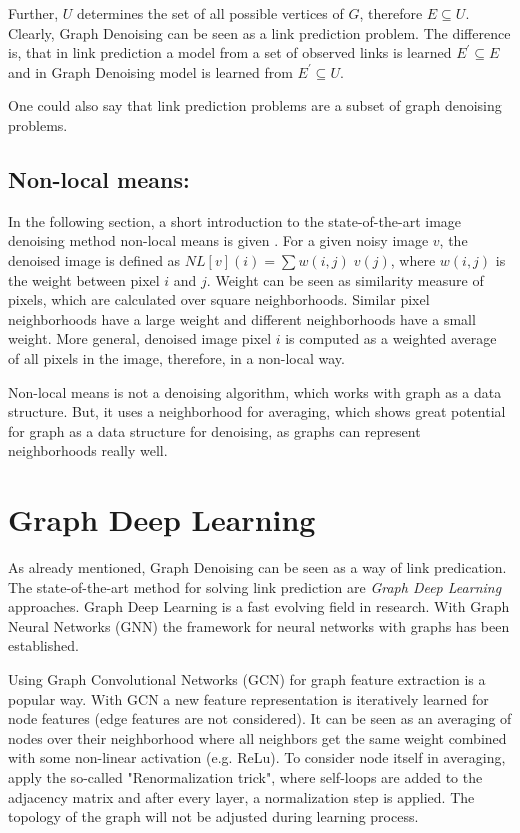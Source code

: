 Further, $U$ determines the set of all possible vertices of $G$, therefore $E \subseteq U$.
Clearly, Graph Denoising can be seen as a link prediction problem.
The difference is, that in link prediction a model from a set of observed links is learned
$E^{\prime} \subseteq E$ and in Graph Denoising model is learned from 
$E^{\prime} \subseteq U$. 

\begin{tcolorbox}[colback=red!5!white,colframe=red!75!black]
    One could also say that link prediction problems are a subset of graph denoising problems.
\end{tcolorbox}

\subsection{Non-local means:}
In the following section, a short introduction to the 
state-of-the-art image denoising method non-local means is given \cite{noneLocalMean}.
For a given noisy image $v$, the denoised image is defined as $NL[v](i) = \sum{w(i,j) \; v(j)}$,
where $w(i,j)$ is the weight between pixel $i$ and $j$. 
Weight can be seen as similarity measure of pixels, which are calculated over square neighborhoods.
Similar pixel neighborhoods have a large weight and different neighborhoods have a small weight.
More general, denoised image pixel $i$ is computed as a weighted average of all pixels in the 
image, therefore, in a non-local way.

Non-local means is not a denoising algorithm, which works with graph as a data structure.
But, it uses a neighborhood for averaging, which shows great potential for graph
as a data structure for denoising, as graphs can represent neighborhoods really well.


\section{Graph Deep Learning}
\label{sec:graph_depp_learning}
As already mentioned, Graph Denoising can be seen as a way of link predication. 
The state-of-the-art method for solving link prediction are \textit{Graph Deep Learning} approaches.
Graph Deep Learning is a fast evolving field in research. With Graph Neural Networks (GNN) \cite{GNN} the framework
for neural networks with graphs has been established. 

Using Graph Convolutional Networks (GCN) \cite{GCN} for graph feature extraction is a popular way. 
With GCN a new feature representation is iteratively learned for node features (edge features are not considered).
It can be seen as an averaging of nodes over their neighborhood where all neighbors get the same weight combined with some non-linear activation (e.g. ReLu). 
To consider node itself in averaging, \cite{GCN} apply the so-called "Renormalization trick", where self-loops are added to the 
adjacency matrix and after every layer, a normalization step is applied. 
The topology of the graph will not be adjusted during learning process.

